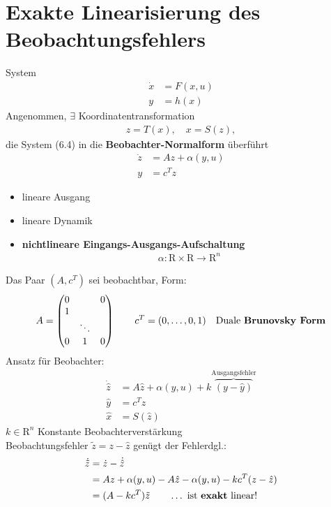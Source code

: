 \documentclass[ngerman]{tudscrreprt}
\begin{document}
\section{Exakte Linearisierung des Beobachtungsfehlers}
System \begin{align*}
\dot x &= F(x,u)\\ y &= h(x) \tag{6.4}
\end{align*}
Angenommen, $\exists$ Koordinatentransformation \begin{align*}
z = T(x), \quad x = S(z),
\end{align*} die System (6.4) in die \textbf{Beobachter-Normalform} überführt \begin{align*}
\dot z &= Az + \alpha(y,u)\\ 
y &= c^T z \tag{6.5}
\end{align*}
\begin{itemize}
\item lineare Ausgang
\item lineare Dynamik
\item \textbf{nichtlineare Eingangs-Ausgangs-Aufschaltung} \begin{align*}
\alpha: \mathrm{R}\times \mathrm{R}\to \mathrm{R}^n
\end{align*}
\end{itemize}
Das Paar $(A, c^T)$ sei beobachtbar, Form: \begin{align*}
A = \begin{pmatrix}
0 && 0\\ 1 &&\\ 
&\ddots&\\ 0&1&0
\end{pmatrix}\qquad
c^T = (0, \dots, 0, 1)\quad \text{Duale \textbf{Brunovsky Form}}
\end{align*}
Ansatz für Beobachter: 
\begin{align*}
\dot{\hat z} &= A \hat z + \alpha(y,u) + k\overbrace{(y - \hat y)}^{\text{Ausgangsfehler}}\\ 
\hat y &= c^T \hat z\\ 
\hat x &= S(\hat z) \tag{6.6}
\end{align*}
$k \in \mathrm{R}^n$ Konstante Beobachterverstärkung\\ 
Beobachtungsfehler $\tilde z = z - \hat z$ genügt der Fehlerdgl.:
\begin{align*}
\dot{\tilde z} &= \dot z - \dot{\hat z}\\ 
&= Az + \alpha(y,u) - A\hat z - \alpha(y,u) - kc^T(z-\hat z)\\ 
&= (A - kc^T)\tilde z \qquad \dots \text{ ist \textbf{exakt} linear!}
\end{align*}
\end{document}
